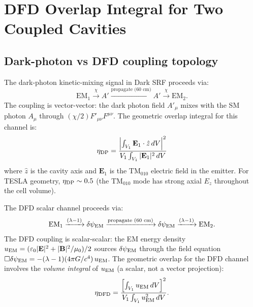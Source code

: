 \documentclass[11pt]{article}
\newcommand{\lam}{\lambda}
\newcommand{\dpsiEM}{\delta\psi_{\rm EM}}
\theoremstyle{definition}
\theoremstyle{remark}
\begin{document}
\section{DFD Overlap Integral for Two Coupled Cavities}
\label{sec:overlap}

\subsection{Dark-photon vs DFD coupling topology}

The dark-photon kinetic-mixing signal in Dark SRF proceeds via:
\begin{equation}
\text{EM}_1 \xrightarrow{\chi} A'
\xrightarrow{\text{propagate (60 cm)}}
A' \xrightarrow{\chi} \text{EM}_2.
\label{eq:dp_chain}
\end{equation}
The coupling is vector-vector: the dark photon field $A'_\mu$
mixes with the SM photon $A_\mu$ through $(\chi/2)F'_{\mu\nu}F^{\mu\nu}$.
The geometric overlap integral for this channel is:
\begin{equation}
\eta_{\rm DP} = \frac{\left|\int_{V_1}\mathbf{E}_1\cdot\hat{z}\,dV\right|^2}
{V_1\int_{V_1}|\mathbf{E}_1|^2\,dV}
\label{eq:eta_dp}
\end{equation}
where $\hat{z}$ is the cavity axis and $\mathbf{E}_1$ is the TM$_{010}$
electric field in the emitter. For TESLA geometry, $\eta_{\rm DP} \sim 0.5$
(the TM$_{010}$ mode has strong axial $E_z$ throughout the cell volume).

The DFD scalar channel proceeds via:
\begin{equation}
\text{EM}_1 \xrightarrow{(\lam-1)} \dpsiEM
\xrightarrow{\text{propagate (60 cm)}}
\dpsiEM \xrightarrow{(\lam-1)} \text{EM}_2.
\label{eq:dfd_chain}
\end{equation}
The DFD coupling is scalar-scalar: the EM energy density
$u_{\rm EM} = (\varepsilon_0|\mathbf{E}|^2 + |\mathbf{B}|^2/\mu_0)/2$
sources $\dpsiEM$ through the field equation
$\Box\dpsiEM = -(\lam-1)(4\pi G/c^4)\,u_{\rm EM}$. The geometric
overlap for the DFD channel involves the \textit{volume integral}
of $u_{\rm EM}$ (a scalar, not a vector projection):
\begin{equation}
\eta_{\rm DFD} = \frac{\left[\int_{V_1}u_{\rm EM}\,dV\right]^2}
{V_1\int_{V_1}u_{\rm EM}^2\,dV}.
\label{eq:eta_dfd}
\end{equation}
\end{document}
